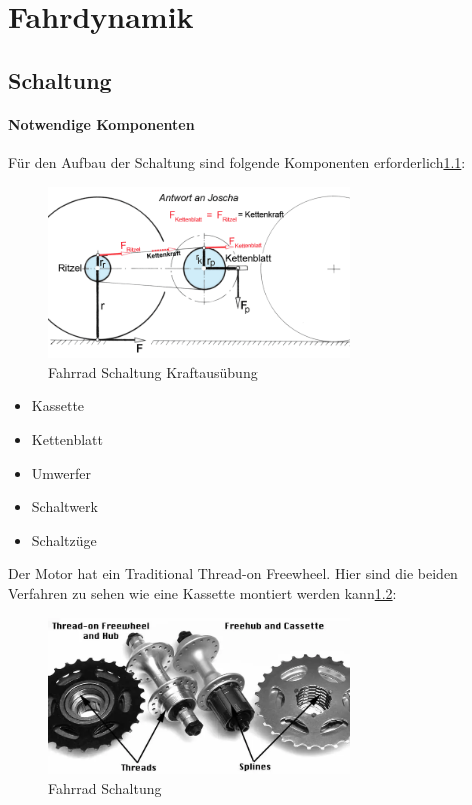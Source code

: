 \chapter{Fahrdynamik}


\section{Schaltung}

\subsubsection*{Notwendige Komponenten}
Für den Aufbau der Schaltung sind folgende Komponenten erforderlich\ref{fig:26}:

\begin{figure}[h]
    \centering
    \includegraphics[width=8cm]{images/fahrrad_kraefte_gross.png}
    \caption{Fahrrad Schaltung Kraftausübung\cite{noauthor_schaltung_nodate}}%
    \label{fig:26}
\end{figure}
  

\begin{itemize}
    \item Kassette 
    \item Kettenblatt 
    \item Umwerfer
    \item Schaltwerk
    \item Schaltzüge
\end{itemize}

Der Motor hat ein Traditional Thread-on Freewheel.
Hier sind die beiden Verfahren zu sehen wie eine Kassette montiert werden kann\ref{fig:24}:

\begin{figure}[h!]
    \centering
    \includegraphics[width=8cm]{images/freewheel-vs-k7.png}
    \caption{Fahrrad Schaltung\cite{noauthor_traditional_nodate}}
    \label{fig:24}
\end{figure}



